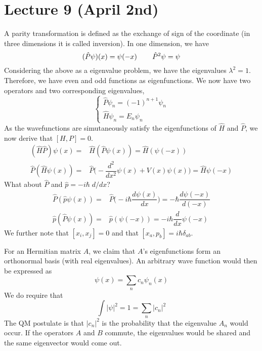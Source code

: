 \section{Lecture 9 (April 2nd)}
\begin{defi}
A parity transformation is defined as the exchange of sign of the coordinate (in three dimensions it is called inversion). In one dimension, we have
\[(\hat{P}\psi )(x)=\psi (-x)\hspace{5ex}\hat{P}^2\psi =\psi \]
Considering the above as a eigenvalue problem, we have the eigenvalues $\lambda ^2=1$. Therefore, we have even and odd functions as eigenfunctions. We now have two operators and two corresponding eigenvalues,
\[\begin{cases}
\hat{P}\psi _{n}=(-1)^{n+1}\psi _{n}\\
\hat{H}\psi _{n}=E_{n}\psi _{n}
\end{cases}\]
As the wavefunctions are simutaneously satisfy the eigenfunctions of $\hat{H}$ and $\hat{P}$, we now derive that $[H,P]=0$.
\begin{align*}
(\hat{H}\hat{P})\psi(x)=&\hat{H}(\hat{P}\psi (x))=\hat{H}(\psi (-x))\\
\hat{P}(\hat{H}\psi (x))=&\hat{P}\Big(-\dfrac{d ^2}{d x^2}\psi (x)+V(x)\psi (x) \Big)=\hat{H}\psi (-x)
\end{align*}
What about $\hat{P}$ and $\hat{p}=-i\hbar\;d/dx$?
\begin{align*}
\hat{P}(\hat{p}\psi (x))=&\hat{P}\Big(-i\hbar \dfrac{d \psi (x)}{d x} \Big)=-\hbar \dfrac{d \psi (-x)}{d (-x)}\\
\hat{p}(\hat{P}\psi (x))=&\hat{p}(\psi (-x))=-i\hbar \dfrac{d }{d x}\psi (-x) 
\end{align*}
We further note that $[x_{i},x_{j}]=0$ and that $[x_{a},p_{b}]=i\hbar \delta _{ab}$.
\end{defi}
\vspace{2ex}
\begin{thm}
For an Hermitian matrix $A$, we claim that $A$'s eigenfunctions form an orthonormal basis (with real eigenvalues). An arbitrary wave function would then be expressed as
\[\psi (x)=\sum _{n}c_{n}\psi _{n}(x)\]
We do require that
\[\int |\psi |^2=1=\sum _{n}|c_{n}|^2\]
The QM postulate is that $|c_{n}|^2$ is the probability that the eigenvalue $A_{n}$ would occur. If the operators $A$ and $B$ commute, the eigenvalues would be shared and the same eigenvector would come out.
\end{thm}
\vspace{2ex}
